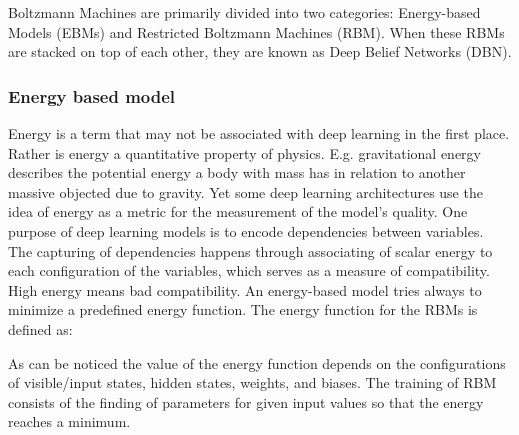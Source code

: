 Boltzmann Machines are primarily divided into two categories: Energy-based Models (EBMs) and Restricted Boltzmann Machines (RBM). When these RBMs are stacked on top of each other, they are known as Deep Belief Networks (DBN).

\subsubsection{Energy based model}

Energy is a term that may not be associated with deep learning in the first place. Rather is energy a quantitative property of physics. E.g. gravitational energy describes the potential energy a body with mass has in relation to another massive objected due to gravity. Yet some deep learning architectures use the idea of energy as a metric for the measurement of the model’s quality.
One purpose of deep learning models is to encode dependencies between variables. The capturing of dependencies happens through associating of scalar energy to each configuration of the variables, which serves as a measure of compatibility. High energy means bad compatibility. An energy-based model tries always to minimize a predefined energy function. The energy function for the RBMs is defined as:


As can be noticed the value of the energy function depends on the configurations of visible/input states, hidden states, weights, and biases. The training of RBM consists of the finding of parameters for given input values so that the energy reaches a minimum.


